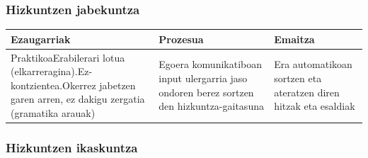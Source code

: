 \documentclass[
]{book}
\begin{document}
\hypertarget{hizkuntzen-jabekuntza}{%
\subsubsection{Hizkuntzen jabekuntza}\label{hizkuntzen-jabekuntza}}

\begin{longtable}[]{@{}lll@{}}
\toprule
\begin{minipage}[b]{0.30\columnwidth}\raggedright
Ezaugarriak\strut
\end{minipage} & \begin{minipage}[b]{0.30\columnwidth}\raggedright
Prozesua\strut
\end{minipage} & \begin{minipage}[b]{0.30\columnwidth}\raggedright
Emaitza\strut
\end{minipage}\tabularnewline
\midrule
\endhead
\begin{minipage}[t]{0.30\columnwidth}\raggedright
PraktikoaErabilerari lotua (elkarreragina).Ez-kontzientea.Okerrez jabetzen garen arren, ez dakigu zergatia (gramatika arauak)\strut
\end{minipage} & \begin{minipage}[t]{0.30\columnwidth}\raggedright
Egoera komunikatiboan input ulergarria jaso ondoren berez sortzen den hizkuntza-gaitasuna\strut
\end{minipage} & \begin{minipage}[t]{0.30\columnwidth}\raggedright
Era automatikoan sortzen eta ateratzen diren hitzak eta esaldiak\strut
\end{minipage}\tabularnewline
\bottomrule
\end{longtable}

\hypertarget{hizkuntzen-ikaskuntza}{%
\subsubsection{Hizkuntzen ikaskuntza}\label{hizkuntzen-ikaskuntza}}
\end{document}
